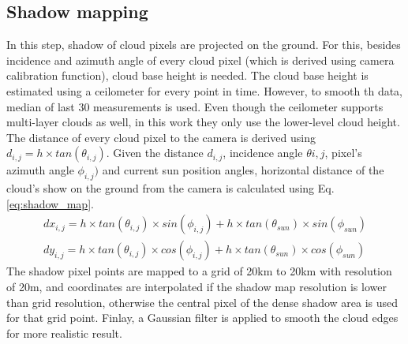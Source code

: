 \subsection{Shadow mapping}
In this step, shadow of cloud pixels are projected on the ground. For this, besides incidence and azimuth angle of every cloud pixel (which is derived using camera calibration function), cloud base height is needed. The cloud base height is estimated using a ceilometer for every point in time. However, to smooth th data, median of last 30 measurements is used. Even though the ceilometer supports multi-layer clouds as well, in this work they only use the lower-level cloud height. The distance of every cloud pixel to the camera is derived using $d_{i,j} = h \times tan(\theta_{i,j})$. Given the distance $d_{i,j}$, incidence angle $\theta{i,j}$, pixel's azimuth angle $\phi_{i,j})$ and current sun position angles, horizontal distance of the cloud's show on the ground from the camera is calculated using Eq. \ref{eq:shadow_map}.
\begin{equation}
\label{eq:shadow_map}
\begin{split}
dx_{i,j} = h \times tan(\theta_{i,j}) \times sin(\phi_{i,j}) + h \times tan(\theta_{sun}) \times sin(\phi_{sun}) \\
dy_{i,j} = h \times tan(\theta_{i,j}) \times cos(\phi_{i,j}) + h \times tan(\theta_{sun}) \times cos(\phi_{sun})
\end{split}
\end{equation}
The shadow pixel points are mapped to a grid of 20km to 20km with resolution of 20m, and coordinates are interpolated if the shadow map resolution is lower than grid resolution, otherwise the central pixel of the dense shadow area is used for that grid point. Finlay, a Gaussian filter is applied to smooth the cloud edges for more realistic result.

